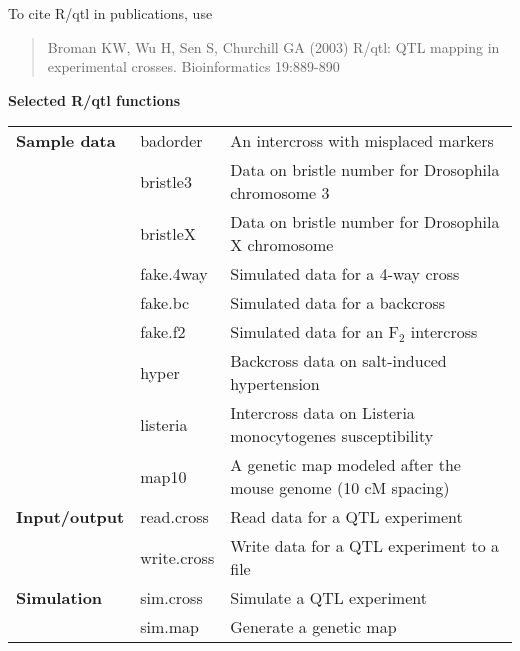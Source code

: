 \documentclass[10pt,letterpaper]{article}
\begin{document}
To cite R/qtl in publications, use

\begin{quote}
Broman KW, Wu H, Sen S, Churchill GA (2003) R/qtl: QTL mapping in
experimental crosses.  Bioinformatics 19:889-890
\end{quote}

\newpage

\noindent \textbf{Selected R/qtl functions} 

\noindent \begin{tabular}{lll} 
\hspace*{35mm} & \hspace*{25mm} & \hspace*{103mm} \\ \hline
\textbf{Sample data} 
& badorder & An intercross with misplaced markers \\
& bristle3 & Data on bristle number for Drosophila chromosome 3 \\
& bristleX & Data on bristle number for Drosophila X chromosome \\
& fake.4way & Simulated data for a 4-way cross \\
& fake.bc & Simulated data for a backcross \\
& fake.f2 & Simulated data for an F$_2$ intercross \\
& hyper & Backcross data on salt-induced hypertension \\ 
& listeria & Intercross data on Listeria monocytogenes
susceptibility \\ 
& map10 & A genetic map modeled after the mouse genome (10 cM
spacing)\\ 
\hline

\textbf{Input/output} 
& read.cross & Read data for a QTL
experiment \\
& write.cross & Write data for a QTL experiment to a file \\
\hline 

\textbf{Simulation} 
& sim.cross & Simulate a QTL experiment \\
& sim.map & Generate a genetic map \\ 
\hline


\end{tabular}
\end{document}
